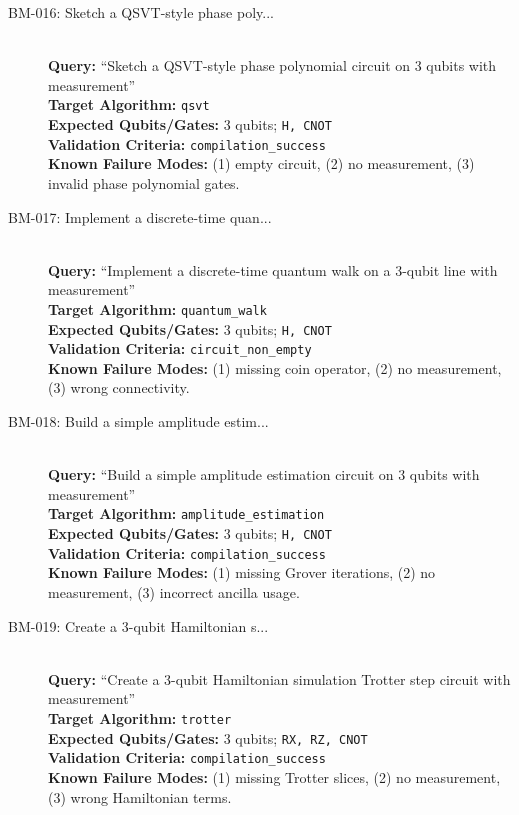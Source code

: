 \begin{description}
    \item[BM-016: Sketch a QSVT-style phase poly...] \ \\
    \textbf{Query:} ``Sketch a QSVT-style phase polynomial circuit on 3 qubits with measurement'' \\
    \textbf{Target Algorithm:} \texttt{qsvt} \\
    \textbf{Expected Qubits/Gates:} 3 qubits; \texttt{H, CNOT} \\
    \textbf{Validation Criteria:} \texttt{compilation\_success} \\
    \textbf{Known Failure Modes:} (1) empty circuit, (2) no measurement, (3) invalid phase polynomial gates.

    \item[BM-017: Implement a discrete-time quan...] \ \\
    \textbf{Query:} ``Implement a discrete-time quantum walk on a 3-qubit line with measurement'' \\
    \textbf{Target Algorithm:} \texttt{quantum\_walk} \\
    \textbf{Expected Qubits/Gates:} 3 qubits; \texttt{H, CNOT} \\
    \textbf{Validation Criteria:} \texttt{circuit\_non\_empty} \\
    \textbf{Known Failure Modes:} (1) missing coin operator, (2) no measurement, (3) wrong connectivity.

    \item[BM-018: Build a simple amplitude estim...] \ \\
    \textbf{Query:} ``Build a simple amplitude estimation circuit on 3 qubits with measurement'' \\
    \textbf{Target Algorithm:} \texttt{amplitude\_estimation} \\
    \textbf{Expected Qubits/Gates:} 3 qubits; \texttt{H, CNOT} \\
    \textbf{Validation Criteria:} \texttt{compilation\_success} \\
    \textbf{Known Failure Modes:} (1) missing Grover iterations, (2) no measurement, (3) incorrect ancilla usage.

    \item[BM-019: Create a 3-qubit Hamiltonian s...] \ \\
    \textbf{Query:} ``Create a 3-qubit Hamiltonian simulation Trotter step circuit with measurement'' \\
    \textbf{Target Algorithm:} \texttt{trotter} \\
    \textbf{Expected Qubits/Gates:} 3 qubits; \texttt{RX, RZ, CNOT} \\
    \textbf{Validation Criteria:} \texttt{compilation\_success} \\
    \textbf{Known Failure Modes:} (1) missing Trotter slices, (2) no measurement, (3) wrong Hamiltonian terms.


\end{description}
